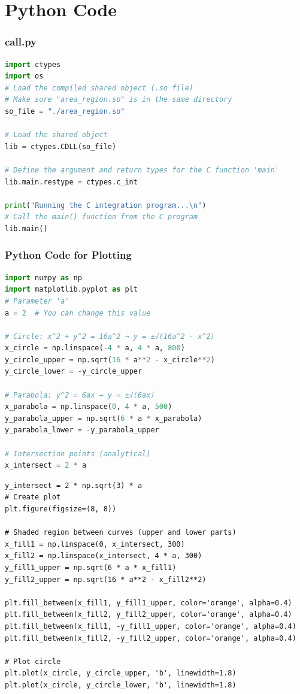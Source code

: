 \documentclass{beamer}
\theoremstyle{remark}
\numberwithin{equation}{section}
\begin{document}
\section{Python Code}
\begin{frame}[fragile]
\frametitle{call.py}
\begin{lstlisting}[language=Python]
import ctypes
import os
# Load the compiled shared object (.so file)
# Make sure "area_region.so" is in the same directory
so_file = "./area_region.so"

# Load the shared object
lib = ctypes.CDLL(so_file)

# Define the argument and return types for the C function 'main'
lib.main.restype = ctypes.c_int

print("Running the C integration program...\n")
# Call the main() function from the C program
lib.main()

\end{lstlisting}
\end{frame}
\begin{frame}[fragile]
\frametitle{Python Code for Plotting}
\begin{lstlisting}[language=Python]
import numpy as np
import matplotlib.pyplot as plt
# Parameter 'a'
a = 2  # You can change this value

# Circle: x^2 + y^2 = 16a^2 → y = ±√(16a^2 - x^2)
x_circle = np.linspace(-4 * a, 4 * a, 800)
y_circle_upper = np.sqrt(16 * a**2 - x_circle**2)
y_circle_lower = -y_circle_upper

# Parabola: y^2 = 6ax → y = ±√(6ax)
x_parabola = np.linspace(0, 4 * a, 500)
y_parabola_upper = np.sqrt(6 * a * x_parabola)
y_parabola_lower = -y_parabola_upper

# Intersection points (analytical)
x_intersect = 2 * a
\end{lstlisting}
\end{frame}
\begin{frame}[fragile]
\begin{lstlisting}
y_intersect = 2 * np.sqrt(3) * a
# Create plot
plt.figure(figsize=(8, 8))

# Shaded region between curves (upper and lower parts)
x_fill1 = np.linspace(0, x_intersect, 300)
x_fill2 = np.linspace(x_intersect, 4 * a, 300)
y_fill1_upper = np.sqrt(6 * a * x_fill1)
y_fill2_upper = np.sqrt(16 * a**2 - x_fill2**2)

plt.fill_between(x_fill1, y_fill1_upper, color='orange', alpha=0.4)
plt.fill_between(x_fill2, y_fill2_upper, color='orange', alpha=0.4)
plt.fill_between(x_fill1, -y_fill1_upper, color='orange', alpha=0.4)
plt.fill_between(x_fill2, -y_fill2_upper, color='orange', alpha=0.4)

# Plot circle
plt.plot(x_circle, y_circle_upper, 'b', linewidth=1.8)
plt.plot(x_circle, y_circle_lower, 'b', linewidth=1.8)
\end{lstlisting}
\end{frame}
\end{document}

